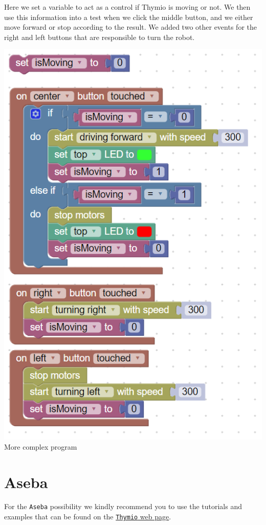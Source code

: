 \documentclass{scrbook}
\begin{document}
Here we set a variable to act as a control if Thymio is moving or not. We then use this information into a test when we click the middle button, and we either move forward or stop according to the result. 
We added two other events for the right and left buttons that are responsible to turn the robot.
\begin{center}
  \includegraphics[scale=0.5]{./Blockly/advanced_program}\\
  More complex program
\end{center}

\section{Aseba}

For the \texttt{Aseba} possibility we kindly recommend you to use the tutorials and examples that can be found on the \href{https://www.thymio.org/program/aseba/}{\texttt{Thymio} web page}.
\end{document}
